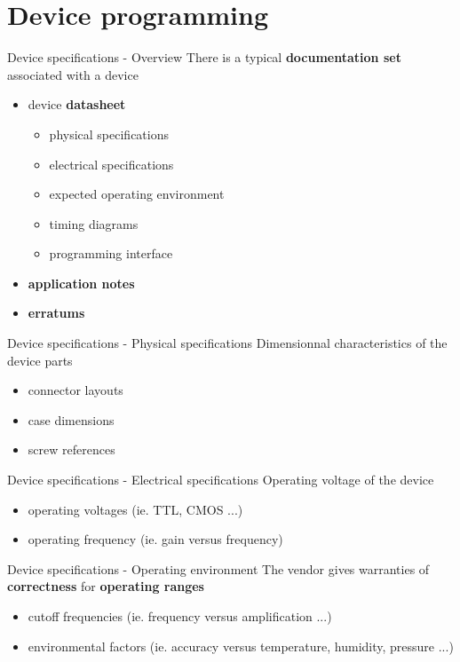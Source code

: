 %
%
\section{Device programming}

\begin{frame}{Device specifications - Overview}
  There is a typical \textbf{documentation set} associated with a device
  \begin{itemize}
  \item device \textbf{datasheet}
    \begin{itemize}
    \item physical specifications
    \item electrical specifications
    \item expected operating environment
    \item timing diagrams
    \item programming interface
  \end{itemize}
  \item \textbf{application notes}
  \item \textbf{erratums}
  \end{itemize}
\end{frame}

\begin{frame}{Device specifications - Physical specifications}
  Dimensionnal characteristics of the device parts
  \begin{itemize}
  \item connector layouts
  \item case dimensions
  \item screw references
  \end{itemize}
\end{frame}

\begin{frame}{Device specifications - Electrical specifications}
  Operating voltage of the device
  \begin{itemize}
  \item operating voltages (ie. TTL, CMOS ...)
  \item operating frequency (ie. gain versus frequency)
  \end{itemize}
\end{frame}

\begin{frame}{Device specifications - Operating environment}
  The vendor gives warranties of \textbf{correctness} for \textbf{operating ranges}
  \begin{itemize}
  \item cutoff frequencies (ie. frequency versus amplification ...)
  \item environmental factors (ie. accuracy versus temperature, humidity, pressure ...)
  \end{itemize}
\end{frame}

